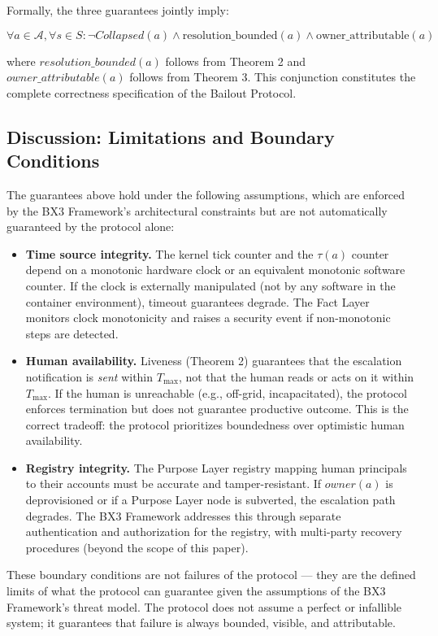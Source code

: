 Formally, the three guarantees jointly imply:

\[
\forall a \in \mathcal{A}, \forall s \in S: \neg Collapsed(a) \land \text{resolution\_bounded}(a) \land \text{owner\_attributable}(a)
\]

where $resolution\_bounded(a)$ follows from Theorem 2 and $owner\_attributable(a)$ follows from Theorem 3. This conjunction constitutes the complete correctness specification of the Bailout Protocol.

\subsection{Discussion: Limitations and Boundary Conditions}

The guarantees above hold under the following assumptions, which are enforced by the BX3 Framework's architectural constraints but are not automatically guaranteed by the protocol alone:

\begin{itemize}
\item \textbf{Time source integrity.} The kernel tick counter and the $\tau(a)$ counter depend on a monotonic hardware clock or an equivalent monotonic software counter. If the clock is externally manipulated (not by any software in the container environment), timeout guarantees degrade. The Fact Layer monitors clock monotonicity and raises a security event if non-monotonic steps are detected.

\item \textbf{Human availability.} Liveness (Theorem 2) guarantees that the escalation notification is \textit{sent} within $T_\text{max}$, not that the human reads or acts on it within $T_\text{max}$. If the human is unreachable (e.g., off-grid, incapacitated), the protocol enforces termination but does not guarantee productive outcome. This is the correct tradeoff: the protocol prioritizes boundedness over optimistic human availability.

\item \textbf{Registry integrity.} The Purpose Layer registry mapping human principals to their accounts must be accurate and tamper-resistant. If $owner(a)$ is deprovisioned or if a Purpose Layer node is subverted, the escalation path degrades. The BX3 Framework addresses this through separate authentication and authorization for the registry, with multi-party recovery procedures (beyond the scope of this paper).
\end{itemize}

These boundary conditions are not failures of the protocol — they are the defined limits of what the protocol can guarantee given the assumptions of the BX3 Framework's threat model. The protocol does not assume a perfect or infallible system; it guarantees that failure is always bounded, visible, and attributable.

